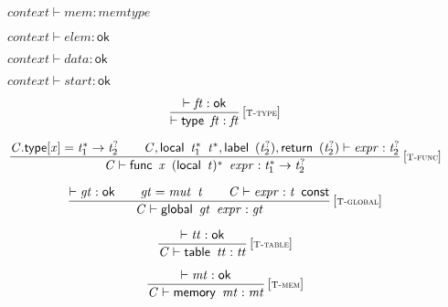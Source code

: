 $\boxed{{\mathit{context}} \vdash {\mathit{mem}} : {\mathit{memtype}}}$

$\boxed{{\mathit{context}} \vdash {\mathit{elem}} : \mathsf{ok}}$

$\boxed{{\mathit{context}} \vdash {\mathit{data}} : \mathsf{ok}}$

$\boxed{{\mathit{context}} \vdash {\mathit{start}} : \mathsf{ok}}$

\vspace{1ex}

$$
\begin{array}{@{}c@{}}\displaystyle
\frac{
{ \vdash }\;{\mathit{ft}} : \mathsf{ok}
}{
{ \vdash }\;\mathsf{type}~\,{\mathit{ft}} : {\mathit{ft}}
} \, {[\textsc{\scriptsize T{-}type}]}
\qquad
\end{array}
$$

$$
\begin{array}{@{}c@{}}\displaystyle
\frac{
{\mathit{C}}.\mathsf{type}{}[{\mathit{x}}] = {{\mathit{t}}_{{1}}^\ast} \rightarrow {{\mathit{t}}_{{2}}^?}
 \qquad
{\mathit{C}}, \mathsf{local}~\,{{\mathit{t}}_{{1}}^\ast}~\,{{\mathit{t}}^\ast}, \mathsf{label}~\,({{\mathit{t}}_{{2}}^?}), \mathsf{return}~\,({{\mathit{t}}_{{2}}^?}) \vdash {\mathit{expr}} : {{\mathit{t}}_{{2}}^?}
}{
{\mathit{C}} \vdash \mathsf{func}~\,{\mathit{x}}~\,{(\mathsf{local}~\,{\mathit{t}})^\ast}~\,{\mathit{expr}} : {{\mathit{t}}_{{1}}^\ast} \rightarrow {{\mathit{t}}_{{2}}^?}
} \, {[\textsc{\scriptsize T{-}func}]}
\qquad
\end{array}
$$

$$
\begin{array}{@{}c@{}}\displaystyle
\frac{
{ \vdash }\;{\mathit{gt}} : \mathsf{ok}
 \qquad
{\mathit{gt}} = {\mathit{mut}}~\,{\mathit{t}}
 \qquad
{\mathit{C}} \vdash {\mathit{expr}} : {\mathit{t}}~\,\mathsf{const}
}{
{\mathit{C}} \vdash \mathsf{global}~\,{\mathit{gt}}~\,{\mathit{expr}} : {\mathit{gt}}
} \, {[\textsc{\scriptsize T{-}global}]}
\qquad
\end{array}
$$

$$
\begin{array}{@{}c@{}}\displaystyle
\frac{
{ \vdash }\;{\mathit{tt}} : \mathsf{ok}
}{
{\mathit{C}} \vdash \mathsf{table}~\,{\mathit{tt}} : {\mathit{tt}}
} \, {[\textsc{\scriptsize T{-}table}]}
\qquad
\end{array}
$$

$$
\begin{array}{@{}c@{}}\displaystyle
\frac{
{ \vdash }\;{\mathit{mt}} : \mathsf{ok}
}{
{\mathit{C}} \vdash \mathsf{memory}~\,{\mathit{mt}} : {\mathit{mt}}
} \, {[\textsc{\scriptsize T{-}mem}]}
\qquad
\end{array}
$$

